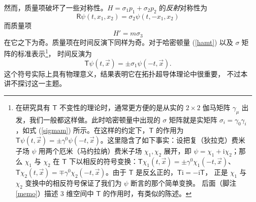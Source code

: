 \documentclass[11pt,a4paper]{article}
\numberwithin{equation}{section}
\def\sR{{\mathsf R}}
\def\sT{{\mathsf T}}
\def\g{\gamma}
\def\i{\mathrm i}
\def\be{\begin{equation}}
\def\ee{\end{equation}}
\begin{document}
然而，质量项破坏了一些对称性。$H=\sigma_1 p_1+\sigma_2 p_2$
的{\it 反射}对称性为
\be\label{zono}\sR\psi(t,x_1,x_2)= \sigma_2\psi(t,-x_1,x_2)\ee
而质量项
\be\label{ozono}H'=m\sigma_3\ee
在它之下为奇。质量项在时间反演下同样为奇。对于哈密顿量 (\ref{hamt}) 以及
$\sigma$ 矩阵的标准表示\footnote{在研究具有 $\sT$ 不变性的理论时，通常更方便的是从实的
$2\times 2$ 伽马矩阵 $\g_\mu$ 出发，我们一般都这样做。此时哈密顿量中出现的 $\sigma$ 矩阵就是实矩阵
$\sigma_i=\g_0\g_i$，如式 (\ref{sigmam}) 所示。在这样的约定下，$\sT$ 的作用为
$\sT\psi(t,\vec x)=\pm\g^0\psi(-t,\vec x)$。这里隐含了如下事实：设把复（狄拉克）费米子场 $\psi$
用两个厄米（马约拉纳）费米子场 $\chi_1,\chi_2$ 展开，即 $\psi=\chi_1+\i\chi_2$；那么 $\chi_1$ 与 $\chi_2 $
在 $\sT$ 下以相反的符号变换：$\sT\chi_1(t,\vec x)=\pm \g^0\chi_1(-t,\vec x)$、
$\sT\chi_2(t,\vec x)=\mp \g^0\chi_2(-t,\vec x)$。由于 $\sT$ 是反幺正的，$\sT\i=-\i\sT$，
正是 $\chi_1$ 与 $\chi_2$ 变换中的相反符号保证了我们为 $\psi$ 断言的那个简单变换。
后面（脚注 \ref{memo}）描述 3 维空间中 $\sT$ 的作用时，有类似的陈述。}，
时间反演为
\be\label{zamt}\sT\psi(t,\vec x)=\pm\sigma_1\psi(-t,\vec x). \ee
这个符号实际上具有物理意义，结果表明它在拓扑超导体理论中很重要，
不过本讲不探讨这一主题。
\end{document}
